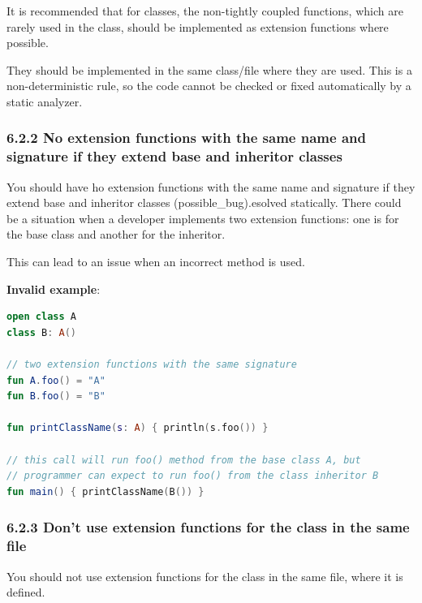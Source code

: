 \label{sec:6.2.1}

It is recommended that for classes, the non-tightly coupled functions, which are rarely used in the class, should be implemented as extension functions where possible.

They should be implemented in the same class/file where they are used. This is a non-deterministic rule, so the code cannot be checked or fixed automatically by a static analyzer.



\subsubsection*{\textbf{6.2.2 No extension functions with the same name and signature if they extend base and inheritor classes}}
\leavevmode\newline

\label{sec:6.2.2}

You should have ho extension functions with the same name and signature if they extend base and inheritor classes (possible\_bug).esolved statically. There could be a situation when a developer implements two extension functions: one is for the base class and another for the inheritor.

This can lead to an issue when an incorrect method is used.



\textbf{Invalid example}:

\begin{lstlisting}[language=Kotlin]
open class A
class B: A()

// two extension functions with the same signature
fun A.foo() = "A"
fun B.foo() = "B"

fun printClassName(s: A) { println(s.foo()) }

// this call will run foo() method from the base class A, but
// programmer can expect to run foo() from the class inheritor B
fun main() { printClassName(B()) }
\end{lstlisting}


\subsubsection*{\textbf{6.2.3 Don't use extension functions for the class in the same file}}
\leavevmode\newline

\label{sec:6.2.3}

You should not use extension functions for the class in the same file, where it is defined.



